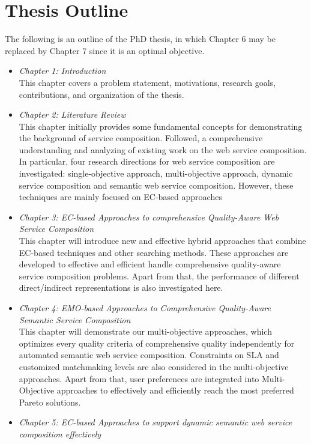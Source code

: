 \section{Thesis Outline}

The following is an outline of the PhD thesis,  in which Chapter 6 may be replaced by Chapter 7 since it is an optimal objective.

\begin{itemize}
 \item \textit{Chapter 1: Introduction}\\
 This chapter covers a problem statement, motivations, research goals, contributions, and organization of the thesis.
 \item \textit{Chapter 2: Literature Review}\\
This chapter initially provides some fundamental concepts for demonstrating the background of service composition. Followed, a comprehensive understanding and analyzing of existing work on the web service composition.  In particular, four research directions for web service composition are investigated: single-objective approach, multi-objective approach, dynamic service composition and semantic web service composition.  However, these techniques are mainly focused on EC-based approaches
 \item \textit{Chapter 3: EC-based Approaches to comprehensive Quality-Aware Web Service Composition}\\
This chapter will introduce new and effective hybrid approaches that combine EC-based techniques and other searching methods. These approaches are developed to effective and efficient handle comprehensive quality-aware service composition problems. Apart from that, the performance of different direct/indirect representations is also investigated here.
 \item \textit{Chapter 4: EMO-based Approaches to Comprehensive Quality-Aware Semantic Service Composition}\\
This chapter will demonstrate our multi-objective approaches, which optimizes every quality criteria of comprehensive quality independently for automated semantic web service composition. Constraints on SLA and customized matchmaking levels are also considered in the multi-objective approaches. Apart from that, user preferences are integrated into Multi-Objective approaches to effectively and efficiently reach the most preferred Pareto solutions.
 \item \textit{Chapter 5: EC-based Approaches to support dynamic semantic web service composition effectively}\\

\end{itemize}
